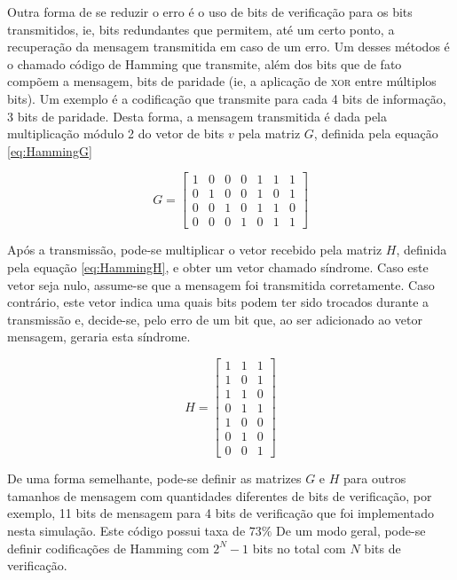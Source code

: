 \documentclass[journal,comsoc]{IEEEtran}
\begin{document}
		Outra forma de se reduzir o erro é o uso de bits de verificação para os bits transmitidos, ie, bits redundantes que permitem, até um certo ponto, a recuperação da mensagem transmitida em caso de um erro. Um desses métodos é o chamado código de Hamming que transmite, além dos bits que de fato compõem a mensagem, bits de paridade (ie, a aplicação de \textsc{xor} entre múltiplos bits). Um exemplo é a codificação que transmite para cada 4 bits de informação, 3 bits de paridade. Desta forma, a mensagem transmitida é dada pela multiplicação módulo 2 do vetor de bits $v$ pela matriz $G$, definida pela equação \ref{eq:HammingG}
		
		\begin{equation}
			G = \begin{bmatrix}
					1 & 0 & 0 & 0 & 1 & 1 & 1 \\
					0 & 1 & 0 & 0 & 1 & 0 & 1 \\
					0 & 0 & 1 & 0 & 1 & 1 & 0 \\
					0 & 0 & 0 & 1 & 0 & 1 & 1
				\end{bmatrix}
			\label{eq:HammingG}
		\end{equation} 
		
		Após a transmissão, pode-se multiplicar o vetor recebido pela matriz $H$, definida pela equação \ref{eq:HammingH}, e obter um vetor chamado síndrome. Caso este vetor seja nulo, assume-se que a mensagem foi transmitida corretamente. Caso contrário, este vetor indica uma quais bits podem ter sido trocados durante a transmissão e, decide-se, pelo erro de um bit que, ao ser adicionado ao vetor mensagem, geraria esta síndrome.
		
		\begin{equation}
			H = \begin{bmatrix}
					1 & 1 & 1 \\
					1 & 0 & 1 \\
					1 & 1 & 0 \\
					0 & 1 & 1 \\
					1 & 0 & 0 \\
					0 & 1 & 0 \\
					0 & 0 & 1 
				\end{bmatrix}
			\label{eq:HammingH}
		\end{equation} 
		
		De uma forma semelhante, pode-se definir as matrizes $G$ e $H$ para outros tamanhos de mensagem com quantidades diferentes de bits de verificação, por exemplo, 11 bits de mensagem para 4 bits de verificação que foi implementado nesta simulação. Este código possui taxa de $73\%$ De um modo geral, pode-se definir codificações de Hamming com $2^N-1$ bits no total com $N$ bits de verificação.
	
\end{document}
